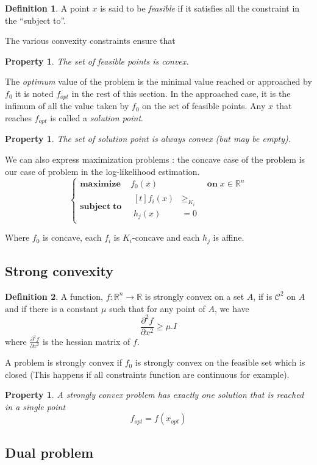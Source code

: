 \documentclass[10pt]{report}
\theoremstyle{plain}
\newtheorem{prop}[thm]{Property}
\theoremstyle{definition}
\newtheorem{defn}{Definition}[chapter]
\theoremstyle{remark}
\newcommand{\R}{\ensuremath{\mathbb{R}}}
\newcommand{\dparn}[3]{\frac{\partial^{#3} {#1}}{\partial{#2}^{#3}}}
\renewcommand{\geq}{\geqslant}
\newcommand{\class}[1]{{\mathscr{C}^{#1}}}
\newcommand{\maxima}[3]{\begin{cases}
    \mathbf{maximize}\,\quad #1& \mathbf{on}\; #2\\
    \mathbf{subject\;to}\quad \begin{aligned}[t]#3\end{aligned}
  \end{cases}}
\begin{document}
\begin{defn}
  A point $x$ is said to be \emph{feasible} if it satisfies all the constraint
  in the ``subject to''.
\end{defn}

The various convexity constraints ensure that

\begin{prop}
  The set of feasible points is convex.
\end{prop}

The \emph{optimum} value of the problem is the minimal value reached or approached by $f_0$ it
is noted $f_{opt}$ in the rest of this section. In the approached case, it is the
infimum of all the value taken by $f_0$ on the set of feasible points.
Any $x$ that reaches $f_{opt}$ is called a \emph{solution point}.

\begin{prop}
  The set of solution point is always convex (but may be empty).
\end{prop}

We can also express maximization problems : the concave case of the problem is
our case of problem in the log-likelihood estimation.
\[\maxima{f_0(x)}{x \in \R^n}{f_i(x) &\geq_{K_i}\\\!h_j(x)&=0}\]

Where $f_0$ is concave, each $f_i$ is $K_i$-concave and each $h_j$ is affine.

\subsection{Strong convexity}

\begin{defn}
  A function, $f : \R^n \to \R$ is strongly convex on a set $A$, if is $\class
  2$ on $A$ and if there is a constant $\mu$ such that
  for any point of $A$, we have
  \[\dparn f x 2 \geq \mu.I\]
  where $\dparn f x 2$ is the hessian matrix of $f$.
\end{defn}

A problem is strongly convex if $f_0$ is strongly convex on the feasible set
which is closed (This happens if all constraints function are continuous for example).

\begin{prop}
  A strongly convex problem has exactly one solution that is reached in a single point
  \[f_{opt} = f(x_{opt})\]
\end{prop}

\subsection{Dual problem}
\end{document}
